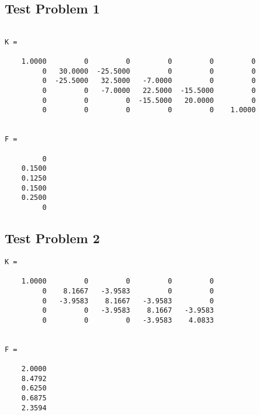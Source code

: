 \documentclass[10pt]{article}
\begin{document}
\subsection*{Test Problem 1}
\lstset{stepnumber=0}
\begin{lstlisting}

K =

    1.0000         0         0         0         0         0
         0   30.0000  -25.5000         0         0         0
         0  -25.5000   32.5000   -7.0000         0         0
         0         0   -7.0000   22.5000  -15.5000         0
         0         0         0  -15.5000   20.0000         0
         0         0         0         0         0    1.0000


F =

         0
    0.1500
    0.1250
    0.1500
    0.2500
         0
\end{lstlisting}
\subsection*{Test Problem 2}
\begin{lstlisting}
K =

    1.0000         0         0         0         0
         0    8.1667   -3.9583         0         0
         0   -3.9583    8.1667   -3.9583         0
         0         0   -3.9583    8.1667   -3.9583
         0         0         0   -3.9583    4.0833


F =

    2.0000
    8.4792
    0.6250
    0.6875
    2.3594
\end{lstlisting}
\end{document}
